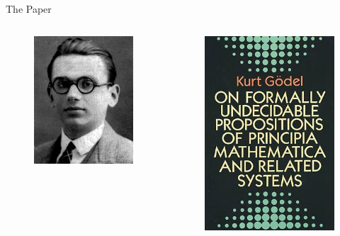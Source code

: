\documentclass{beamer}
\begin{document}
\begin{frame}{The Paper}
  \begin{columns}

    \begin{figure}
      \includegraphics[scale=0.45]{images/godel.png}
    \end{figure}

    \begin{figure}
      \includegraphics[scale=0.45]{images/godel-book.jpg}
    \end{figure}

  \end{columns}
\end{frame}
\end{document}
